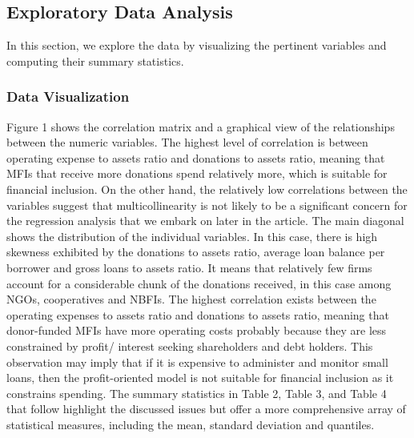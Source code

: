 \documentclass[a4paper,nobind]{templates/ociamthesis}
\begin{document}
\hypertarget{exploratory-data-analysis}{%
\subsection{\texorpdfstring{\textbf{Exploratory Data Analysis}}{Exploratory Data Analysis}}\label{exploratory-data-analysis}}

In this section, we explore the data by visualizing the pertinent variables and computing their summary statistics.

\hypertarget{data-visualization}{%
\subsubsection{\texorpdfstring{\textbf{Data Visualization}}{Data Visualization}}\label{data-visualization}}

Figure 1 shows the correlation matrix and a graphical view of the relationships between the numeric variables. The highest level of correlation is between operating expense to assets ratio and donations to assets ratio, meaning that MFIs that receive more donations spend relatively more, which is suitable for financial inclusion. On the other hand, the relatively low correlations between the variables suggest that multicollinearity is not likely to be a significant concern for the regression analysis that we embark on later in the article. The main diagonal shows the distribution of the individual variables. In this case, there is high skewness exhibited by the donations to assets ratio, average loan balance per borrower and gross loans to assets ratio. It means that relatively few firms account for a considerable chunk of the donations received, in this case among NGOs, cooperatives and NBFIs. The highest correlation exists between the operating expenses to assets ratio and donations to assets ratio, meaning that donor-funded MFIs have more operating costs probably because they are less constrained by profit/ interest seeking shareholders and debt holders. This observation may imply that if it is expensive to administer and monitor small loans, then the profit-oriented model is not suitable for financial inclusion as it constrains spending. The summary statistics in Table 2, Table 3, and Table 4 that follow highlight the discussed issues but offer a more comprehensive array of statistical measures, including the mean, standard deviation and quantiles.
\end{document}
